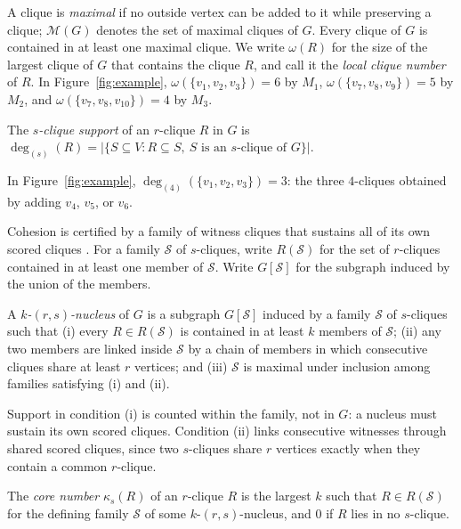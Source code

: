A clique is \emph{maximal} if no outside vertex can be added to it while preserving a clique; $\mathcal{M}(G)$ denotes the set of maximal cliques of $G$.
%
Every clique of $G$ is contained in at least one maximal clique.
%
We write $\omega(R)$ for the size of the largest clique of $G$ that contains the clique $R$, and call it the \emph{local clique number} of $R$.
%
In Figure~\ref{fig:example}, $\omega(\{v_1,v_2,v_3\})=6$ by $M_1$, $\omega(\{v_7,v_8,v_9\})=5$ by $M_2$, and $\omega(\{v_7,v_8,v_{10}\})=4$ by $M_3$.

\begin{definition}\label{def:support}
The \emph{$s$-clique support} of an $r$-clique $R$ in $G$ is
$\deg_{(s)}(R)=|\{S\subseteq V: R\subseteq S,\ S\text{ is an $s$-clique of } G\}|$.
\end{definition}

In Figure~\ref{fig:example}, $\deg_{(4)}(\{v_1,v_2,v_3\})=3$: the three $4$-cliques obtained by adding $v_4$, $v_5$, or $v_6$.

Cohesion is certified by a family of witness cliques that sustains all of its own scored cliques \cite{firstNucleus}.
%
For a family $\mathcal{S}$ of $s$-cliques, write $R(\mathcal{S})$ for the set of $r$-cliques contained in at least one member of $\mathcal{S}$.
%
Write $G[\mathcal{S}]$ for the subgraph induced by the union of the members.

\begin{definition}[$k$-$(r,s)$-Nucleus]\label{def:nucleus}
A \emph{$k$-$(r,s)$-nucleus} of $G$ is a subgraph $G[\mathcal{S}]$ induced by a family $\mathcal{S}$ of $s$-cliques such that
(i) every $R\in R(\mathcal{S})$ is contained in at least $k$ members of $\mathcal{S}$;
(ii) any two members are linked inside $\mathcal{S}$ by a chain of members in which consecutive cliques share at least $r$ vertices;
and (iii) $\mathcal{S}$ is maximal under inclusion among families satisfying (i) and (ii).
\end{definition}

Support in condition (i) is counted within the family, not in $G$: a nucleus must sustain its own scored cliques.
%
Condition (ii) links consecutive witnesses through shared scored cliques, since two $s$-cliques share $r$ vertices exactly when they contain a common $r$-clique.

\begin{definition}\label{def:corenumber}
The \emph{core number} $\kappa_s(R)$ of an $r$-clique $R$ is the largest $k$ such that $R\in R(\mathcal{S})$ for the defining family $\mathcal{S}$ of some $k$-$(r,s)$-nucleus, and $0$ if $R$ lies in no $s$-clique.
\end{definition}

